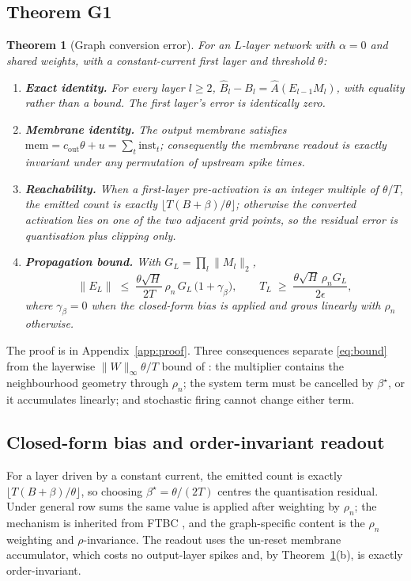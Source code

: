 \documentclass[10pt,twocolumn]{article}
\newtheorem{theorem}{Theorem}
\newcommand{\Ahat}{\hat{A}}
\newcommand{\betastar}{\beta^{\star}}
\newcommand{\Emat}{E}
\newcommand{\hdim}{H}
\newcommand{\rhon}{\rho_n}
\newcommand{\epsPP}{\epsilon}
\begin{document}
\subsection{Theorem G1}
\begin{theorem}[Graph conversion error]\label{thm:g1}
For an $L$-layer network with $\alpha=0$ and shared weights, with a constant-current first layer
and threshold $\theta$:
\begin{enumerate}
\item[(a)] \textbf{Exact identity.} For every layer $l\ge 2$,
$\hat{B}_l-B_l=\Ahat(\Emat_{l-1}M_l)$, with equality rather than a bound. The first layer's error
is identically zero.
\item[(b)] \textbf{Membrane identity.} The output membrane satisfies
$\mathrm{mem}=c_{\mathrm{out}}\theta+u=\sum_{t}\mathrm{inst}_t$; consequently the membrane
readout is exactly invariant under any permutation of upstream spike times.
\item[(c)] \textbf{Reachability.} When a first-layer pre-activation is an integer multiple of
$\theta/T$, the emitted count is exactly $\lfloor T(B+\beta)/\theta\rfloor$; otherwise the
converted activation lies on one of the two adjacent grid points, so the residual error is
quantisation plus clipping only.
\item[(d)] \textbf{Propagation bound.} With $G_L=\prod_{l}\|M_l\|_2$,
\begin{equation}
\|\Emat_L\| \;\le\; \frac{\theta\sqrt{\hdim}}{2T}\,
\rhon\, G_L\,\Big(1+\gamma_{\beta}\Big),\qquad
T_L \;\ge\; \frac{\theta\sqrt{\hdim}\,\rhon G_L}{2\epsPP},
\label{eq:bound}
\end{equation}
where $\gamma_{\beta}=0$ when the closed-form bias is applied and grows linearly with $\rhon$
otherwise.
\end{enumerate}
\end{theorem}
The proof is in Appendix~\ref{app:proof}. Three consequences separate
\eqref{eq:bound} from the layerwise $\|W\|_\infty\theta/T$ bound of \cite{tpp2025}: the
multiplier contains the neighbourhood geometry through $\rhon$; the system term must be cancelled
by $\betastar$, or it accumulates linearly; and stochastic firing cannot change either term.

\subsection{Closed-form bias and order-invariant readout}
For a layer driven by a constant current, the emitted count is exactly
$\lfloor T(B+\beta)/\theta\rfloor$, so choosing $\betastar=\theta/(2T)$ centres the quantisation
residual. Under general row sums the same value is applied after weighting by $\rhon$; the
mechanism is inherited from FTBC \cite{ftbc2024}, and the graph-specific content is the
$\rhon$ weighting and $\rho$-invariance. The readout uses the un-reset membrane accumulator,
which costs no output-layer spikes and, by Theorem~\ref{thm:g1}(b), is exactly order-invariant.
\end{document}

